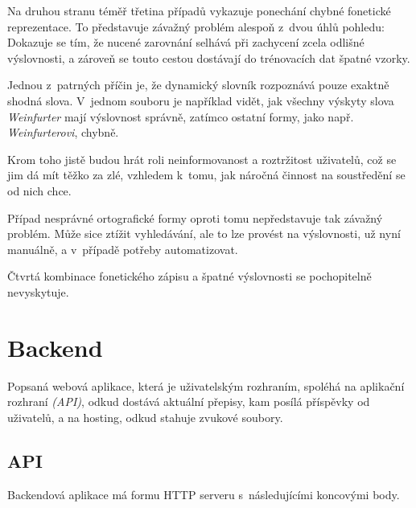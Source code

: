 Na druhou stranu téměř třetina případů vykazuje ponechání chybné fonetické
reprezentace. To představuje závažný problém alespoň z~dvou úhlů pohledu:
Dokazuje se tím, že nucené zarovnání selhává při zachycení zcela odlišné
výslovnosti, a zároveň se touto cestou dostávají do trénovacích dat špatné
vzorky.

Jednou z~patrných příčin je, že dynamický slovník rozpoznává pouze exaktně
shodná slova. V~jednom souboru je například vidět, jak všechny výskyty slova
{\em Weinfurter} mají výslovnost správně, zatímco ostatní formy, jako např. {\em
Weinfurterovi}, chybně.

Krom toho jistě budou hrát roli neinformovanost a roztržitost uživatelů, což se
jim dá mít těžko za zlé, vzhledem k~tomu, jak náročná činnost na soustředění se
od nich chce.

Případ nesprávné ortografické formy oproti tomu nepředstavuje tak závažný
problém. Může sice ztížit vyhledávání, ale to lze provést na výslovnosti,
už nyní manuálně, a v~případě potřeby automatizovat.

Čtvrtá kombinace fonetického zápisu a špatné výslovnosti se pochopitelně
nevyskytuje.

\normalfont 

\section{Backend}

Popsaná webová aplikace, která je uživatelským rozhraním, spoléhá na aplikační
rozhraní {\em (API)}, odkud dostává aktuální přepisy, kam posílá příspěvky od
uživatelů, a na hosting, odkud stahuje zvukové soubory.

\subsection{API}

Backendová aplikace má formu HTTP serveru s~následujícími koncovými body.

